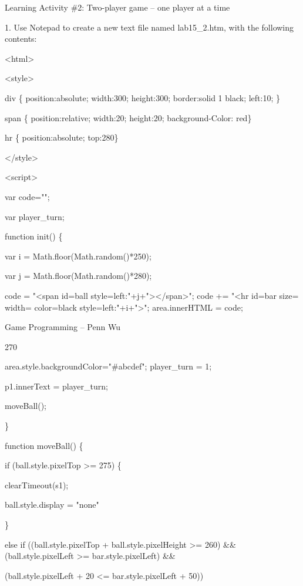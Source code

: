 \documentclass[
]{article}
\begin{document}
Learning Activity \#2: Two-player game -- one player at a time

1. Use Notepad to create a new text file named lab15\_2.htm, with the
following contents:

\textless html\textgreater{}

\textless style\textgreater{}

div \{ position:absolute; width:300; height:300; border:solid 1 black;
left:10; \}

span \{ position:relative; width:20; height:20; background-Color: red\}

hr \{ position:absolute; top:280\}

\textless/style\textgreater{}

\textless script\textgreater{}

var code="";

var player\_turn;

function init() \{

var i = Math.floor(Math.random()*250);

var j = Math.floor(Math.random()*280);

code = "\textless span id=\textquotesingle ball\textquotesingle{}
style=\textquotesingle left:"+j+"\textquotesingle\textgreater\textless/span\textgreater";
code += "\textless hr id=\textquotesingle bar\textquotesingle{}
size=\textquotesingle{}
width=\textquotesingle{}
color=\textquotesingle black\textquotesingle{}
style=\textquotesingle left:"+i+"\textquotesingle\textgreater";
area.innerHTML = code;

Game Programming -- Penn Wu

270

\protect\hypertarget{index_split_014.htmlux5cux23p271}{}{}
area.style.backgroundColor="\#abcdef"; player\_turn = 1;

p1.innerText = player\_turn;

moveBall();

\}

function moveBall() \{

if (ball.style.pixelTop \textgreater= 275) \{

clearTimeout(s1);

ball.style.display = "none"

\}

else if ((ball.style.pixelTop + ball.style.pixelHeight \textgreater=
260) \&\& (ball.style.pixelLeft \textgreater= bar.style.pixelLeft) \&\&

(ball.style.pixelLeft + 20 \textless= bar.style.pixelLeft + 50))
\end{document}
